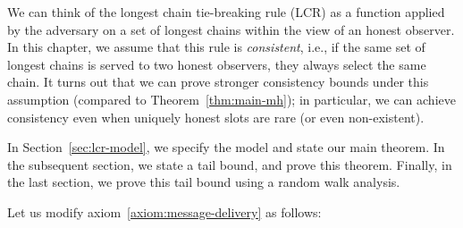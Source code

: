 We can think of the longest chain tie-breaking rule (LCR) 
as a function applied by the adversary on a set of longest chains within the view of an honest observer. 
In this chapter, 
we assume that this rule is \emph{consistent}, i.e., 
if the same set of longest chains is served to two honest observers, 
they always select the same chain. 
It turns out that 
we can prove stronger consistency bounds under this assumption 
(compared to Theorem~\ref{thm:main-mh}); 
in particular, we can achieve consistency even when 
uniquely honest slots are rare (or even non-existent).

In Section~\ref{sec:lcr-model}, we specify the model and state our main theorem. 
In the subsequent section, we state a tail bound, and prove this theorem. 
Finally, in the last section, we prove this tail bound using a random walk analysis.


  Let us 
  modify axiom~\ref{axiom:message-delivery} as follows:

